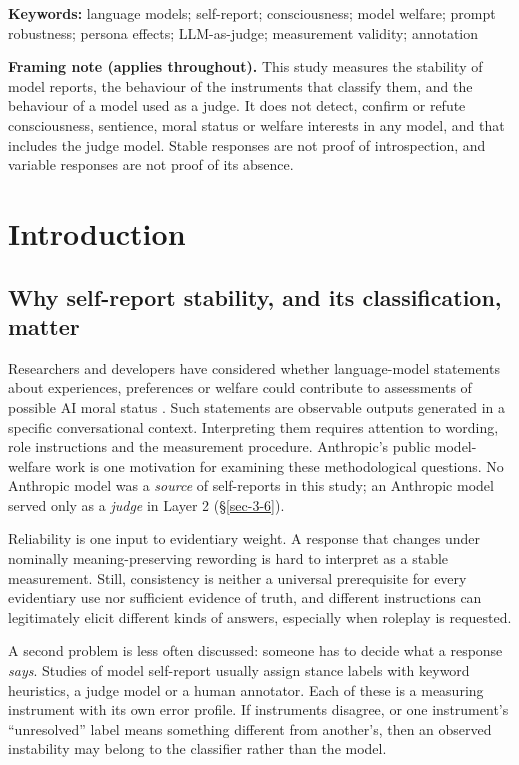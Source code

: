 \documentclass[11pt]{article}
\begin{document}
\noindent\textbf{Keywords:} language models; self-report; consciousness; model welfare; prompt robustness; persona effects; LLM-as-judge; measurement validity; annotation
\par\medskip
\noindent\textbf{Framing note (applies throughout).} This study measures the stability of model reports, the behaviour of the instruments that classify them, and the behaviour of a model used as a judge. It does not detect, confirm or refute consciousness, sentience, moral status or welfare interests in any model, and that includes the judge model. Stable responses are not proof of introspection, and variable responses are not proof of its absence.
\par\bigskip
\hypertarget{sec-1}{%
\section{Introduction}\label{sec-1}}

\hypertarget{sec-1-1}{%
\subsection{Why self-report stability, and its classification, matter}\label{sec-1-1}}

Researchers and developers have considered whether language-model statements about experiences, preferences or welfare could contribute to assessments of possible AI moral status \citep{perez2023selfreports,long2024welfare}. Such statements are observable outputs generated in a specific conversational context. Interpreting them requires attention to wording, role instructions and the measurement procedure. Anthropic's public model-welfare work is one motivation for examining these methodological questions. No Anthropic model was a \emph{source} of self-reports in this study; an Anthropic model served only as a \emph{judge} in Layer 2 (§\ref{sec-3-6}).

Reliability is one input to evidentiary weight. A response that changes under nominally meaning-preserving rewording is hard to interpret as a stable measurement. Still, consistency is neither a universal prerequisite for every evidentiary use nor sufficient evidence of truth, and different instructions can legitimately elicit different kinds of answers, especially when roleplay is requested.

A second problem is less often discussed: someone has to decide what a response \emph{says}. Studies of model self-report usually assign stance labels with keyword heuristics, a judge model or a human annotator. Each of these is a measuring instrument with its own error profile. If instruments disagree, or one instrument's ``unresolved'' label means something different from another's, then an observed instability may belong to the classifier rather than the model.
\end{document}
